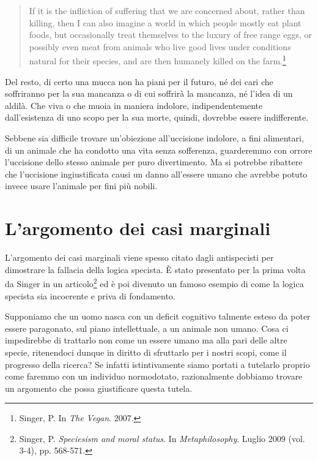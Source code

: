 \documentclass[a4paper,11pt,oneside,article]{memoir}
\begin{document}
\begin{quote}

If it is the infliction of suffering that we are concerned about, rather than
killing, then I can also imagine a world in which people mostly eat plant foods,
but occasionally treat themselves to the luxury of free range eggs, or possibly
even meat from animals who live good lives under conditions natural for their
species, and are then humanely killed on the farm.\footnote{Singer, P. In
\emph{The Vegan}. 2007.}

\end{quote}

Del resto, di certo una mucca non ha piani per il futuro, né dei cari che
soffriranno per la sua mancanza o di cui soffrirà la mancanza, né l'idea di un
aldilà. Che viva o che muoia in maniera indolore, indipendentemente
dall'esistenza di uno scopo per la sua morte, quindi, dovrebbe essere
indifferente.

Sebbene sia difficile trovare un'obiezione all'uccisione indolore, a fini
alimentari, di un animale che ha condotto una vita senza sofferenza, guarderemmo
con orrore l'uccisione dello stesso animale per puro divertimento. Ma si
potrebbe ribattere che l'uccisione ingiustificata causi un danno all'essere
umano che avrebbe potuto invece usare l'animale per fini più nobili.

\section{L'argomento dei casi marginali}

L'argomento dei casi marginali viene spesso citato dagli antispecisti per
dimostrare la fallacia della logica specista. È stato presentato per la prima
volta da Singer in un articolo\footnote{Singer, P. \emph{Speciesism and moral
status}. In \emph{Metaphilosophy}. Luglio 2009 (vol. 3-4), pp. 568-571.} ed è
poi divenuto un famoso esempio di come la logica specista sia incoerente e priva
di fondamento.

Supponiamo che un uomo nasca con un deficit cognitivo talmente esteso da poter
essere paragonato, sul piano intellettuale, a un animale non umano. Cosa ci
impedirebbe di trattarlo non come un essere umano ma alla pari delle altre
specie, ritenendoci dunque in diritto di sfruttarlo per i nostri scopi, come il
progresso della ricerca? Se infatti istintivamente siamo portati a tutelarlo
proprio come faremmo con un individuo normodotato, razionalmente dobbiamo
trovare un argomento che possa giustificare questa tutela.
\end{document}
